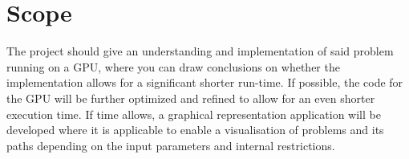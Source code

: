 \documentclass[a4paper, 12pt]{article}
\begin{document}
\section{Scope}
The project should give an understanding and implementation of said problem running on a GPU, where you can draw conclusions on whether the implementation allows for a significant shorter run-time.
If possible, the code for the GPU will be further optimized and refined to allow for an even shorter execution time.
If time allows, a graphical representation application will be developed where it is applicable to enable a visualisation of problems and its paths depending on the input parameters and internal restrictions.
\end{document}
